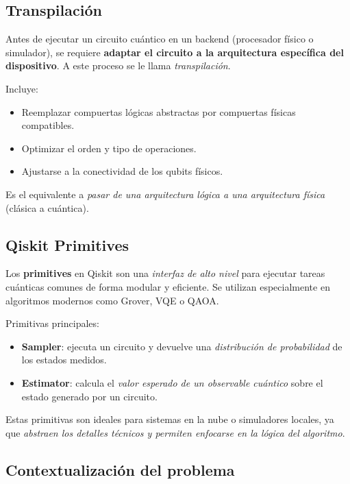 \documentclass{article}
\begin{document}
\subsection*{Transpilación}

Antes de ejecutar un circuito cuántico en un backend (procesador físico o simulador), 
se requiere \textbf{adaptar el circuito a la arquitectura específica del dispositivo}. 
A este proceso se le llama \textit{transpilación}.

Incluye:
\begin{itemize}
    \item Reemplazar compuertas lógicas abstractas por compuertas físicas compatibles.
    \item Optimizar el orden y tipo de operaciones.
    \item Ajustarse a la conectividad de los qubits físicos.
\end{itemize}

Es el equivalente a \textit{pasar de una arquitectura lógica a una arquitectura física} 
(clásica a cuántica).

\subsection*{Qiskit Primitives}

Los \textbf{primitives} en Qiskit son una \textit{interfaz de alto nivel} para ejecutar tareas 
cuánticas comunes de forma modular y eficiente. Se utilizan especialmente en algoritmos 
modernos como Grover, VQE o QAOA.

Primitivas principales:
\begin{itemize}
    \item \textbf{Sampler}: ejecuta un circuito y devuelve una 
            \textit{distribución de probabilidad} de los estados medidos.
    \item \textbf{Estimator}: calcula el \textit{valor esperado de un observable cuántico} 
            sobre el estado generado por un circuito.
\end{itemize}

Estas primitivas son ideales para sistemas en la nube o simuladores locales, 
    ya que \textit{abstraen los detalles técnicos y permiten enfocarse en la lógica del algoritmo}.



\subsection{Contextualización del problema}
\end{document}
